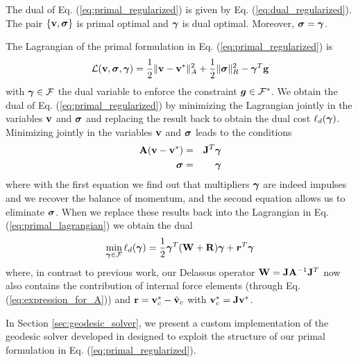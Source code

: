 \begin{theorem}	
The dual of Eq. (\ref{eq:primal_regularized}) is given by Eq.
(\ref{eq:dual_regularized}). The pair $\{{\mathbf{v}},{\bm\sigma}\}$ is primal optimal and
${\bm\gamma}$ is dual optimal. Moreover, ${\bm\sigma} = {\bm\gamma}$.
\label{th:primal_dual_equivalence}
\end{theorem}

\begin{IEEEproof}
The Lagrangian of the primal formulation in Eq. (\ref{eq:primal_regularized}) is
\begin{equation}
	\mathcal{L}(\mf{v},\bsigma,\vf{\gamma}) =
	\frac{1}{2}\Vert\mf{v}-\mf{v}^*\Vert_{A}^2 +
	\frac{1}{2} \Vert\bsigma\Vert_{R}^2 - \vf{\gamma}^T\mf{g}
	\label{eq:primal_lagrangian}
\end{equation}
with ${\bm{\gamma}}\in\mathcal{F}$ the dual variable to enforce the constraint
${\bm{g}}\in \mathcal{F}^*$. We obtain the dual of Eq.
(\ref{eq:primal_regularized}) by minimizing the Lagrangian jointly in the
variables ${\mathbf{v}}$ and ${\bm\sigma}$ and replacing the result back to obtain the
dual cost $\ell_d({\bm{\gamma}})$. Minimizing jointly in the variables ${\mathbf{v}}$
and ${\bm\sigma}$ leads to the conditions
\begin{eqnarray}
	{\mathbf{A}}({\mathbf{v}}-{\mathbf{v}}^*) &=& {\mathbf{J}}^T{\bm{\gamma}}\\
	{\bm{\sigma}} &=& {\bm{\gamma}}
\end{eqnarray}
where with the first equation we find out that multipliers ${\bm\gamma}$ are indeed
impulses and we recover the balance of momentum, and the second equation allows
us to eliminate ${\bm{\sigma}}$. When we replace these results back into the
Lagrangian in Eq. (\ref{eq:primal_lagrangian}) we obtain the dual
\begin{eqnarray}
	\min_{{\bm\gamma}\in \mathcal{F}} \ell_d({\bm\gamma}) =
	\frac{1}{2}{\bm\gamma}^T(\mathbf{W}+\mathbf{R}){\bm\gamma} + {\bm r}^T
	{\bm\gamma}
\end{eqnarray}
where, in contrast to previous work, our Delassus operator
${\mathbf{W}}={\mathbf{J}}{\mathbf{A}}^{-1}{\mathbf{J}}^T$ now also contains the contribution of internal
force elements (through Eq. (\ref{eq:expression_for_A})) and
${\mathbf{r}}={\mathbf{v}}_c^*-\hat{{\mathbf{v}}}_c$ with ${\mathbf{v}}_c^*={\mathbf{J}}{\mathbf{v}}^*$.
\end{IEEEproof}

In Section \ref{sec:geodesic_solver}, we present a custom implementation of the
geodesic solver developed in \cite{bib:permenter2020} designed to exploit the
structure of our primal formulation in Eq. (\ref{eq:primal_regularized}).

